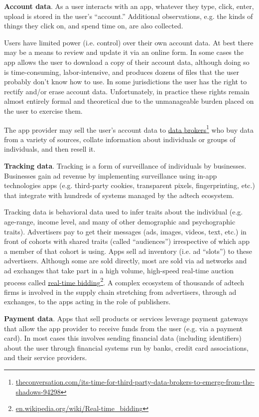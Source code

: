 \documentclass[11pt, oneside]{article}   	%
\newcommand{\hyperfootnote}[1][]{\def\ArgI{{#1}}\hyperfootnoteRelay}
\newcommand\hyperfootnoteRelay[2][]{\href{#1#2}{\ArgI}\footnote{\href{#1#2}{#2}}}
\begin{document}
\textbf{Account data}. As a user interacts with an app, whatever they type, click, enter, upload is stored in the user's ``account.'' Additional observations, e.g. the kinds of things they click on, and spend time on, are also collected. 

Users have limited power (i.e. control) over their own account data. At best there may be a means to review and update it via an online form. In some cases the app allows the user to download a copy of their account data, although doing so is time-consuming, labor-intensive, and produces dozens of files that the user probably don't know how to use. In some jurisdictions the user has the right to rectify and/or erase account data. Unfortunately, in practice these rights remain almost entirely formal and theoretical due to the unmanageable burden placed on the user to exercise them. 

The app provider may sell the user's account data to \hyperfootnote[data brokers][https://]{theconversation.com/its-time-for-third-party-data-brokers-to-emerge-from-the-shadows-94298} who buy data from a variety of sources, collate information about individuals or groups of individuals, and then resell it.

\textbf{Tracking data}. Tracking is a form of surveillance of individuals by businesses. Businesses gain ad revenue by implementing surveillance using in-app technologies apps (e.g. third-party cookies, transparent pixels, fingerprinting, etc.) that integrate with hundreds of systems managed by the adtech ecosystem.

Tracking data is behavioral data used to infer traits about the individual (e.g. age-range, income level, and many of other demographic and psychographic traits). Advertisers pay to get their messages (ads, images, videos, text, etc.) in front of cohorts with shared traits (called ``audiences'') irrespective of which app a member of that cohort is using. Apps sell ad inventory (i.e. ad ``slots'') to these advertisers. Although some are sold directly, most are sold via ad networks and ad exchanges that take part in a high volume, high-speed real-time auction process called \hyperfootnote[real-time bidding][https://]{en.wikipedia.org/wiki/Real-time\_bidding}. A complex ecosystem of thousands of adtech firms is involved in the supply chain stretching from advertisers, through ad exchanges, to the apps acting in the role of publishers. 

\textbf{Payment data}. Apps that sell products or services leverage payment gateways that allow the app provider to receive funds from the user (e.g. via a payment card). In most cases this involves sending financial data (including identifiers) about the user through financial systems run by banks, credit card associations, and their service providers.
\end{document}
